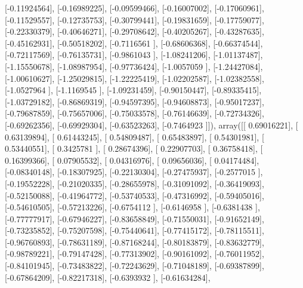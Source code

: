 \documentclass{article}
\begin{document}
       [-0.11924564],
       [-0.16989225],
       [-0.09599466],
       [-0.16007002],
       [-0.17060961],
       [-0.11529557],
       [-0.12735753],
       [-0.30799441],
       [-0.19831659],
       [-0.17759077],
       [-0.22330379],
       [-0.40646271],
       [-0.29708642],
       [-0.40205267],
       [-0.43287635],
       [-0.45162931],
       [-0.50518202],
       [-0.7116561 ],
       [-0.68606368],
       [-0.66374544],
       [-0.72117569],
       [-0.76135731],
       [-0.9861043 ],
       [-1.08241206],
       [-1.01137487],
       [-1.15550678],
       [-1.08987954],
       [-0.97736424],
       [-1.0057059 ],
       [-1.24427084],
       [-1.00610627],
       [-1.25029815],
       [-1.22225419],
       [-1.02202587],
       [-1.02382558],
       [-1.0527964 ],
       [-1.1169545 ],
       [-1.09231459],
       [-0.90150447],
       [-0.89335415],
       [-1.03729182],
       [-0.86869319],
       [-0.94597395],
       [-0.94608873],
       [-0.95017237],
       [-0.79687859],
       [-0.75657006],
       [-0.75033578],
       [-0.76146639],
       [-0.72734326],
       [-0.69262356],
       [-0.69929304],
       [-0.63523263],
       [-0.7464923 ]]), array([[ 0.69016221],
       [ 0.63139894],
       [ 0.61443245],
       [ 0.54809487],
       [ 0.65483897],
       [ 0.54301981],
       [ 0.53440551],
       [ 0.3425781 ],
       [ 0.28674396],
       [ 0.22907703],
       [ 0.36758418],
       [ 0.16399366],
       [ 0.07905532],
       [ 0.04316976],
       [ 0.09656036],
       [ 0.04174484],
       [-0.08340148],
       [-0.18307925],
       [-0.22130304],
       [-0.27475937],
       [-0.2577015 ],
       [-0.19552228],
       [-0.21020335],
       [-0.28655978],
       [-0.31091092],
       [-0.36419093],
       [-0.52150088],
       [-0.41964772],
       [-0.53740533],
       [-0.47316992],
       [-0.59405016],
       [-0.54610505],
       [-0.57213226],
       [-0.6754112 ],
       [-0.6146958 ],
       [-0.6381438 ],
       [-0.77777917],
       [-0.67946227],
       [-0.83658849],
       [-0.71550031],
       [-0.91652149],
       [-0.73235852],
       [-0.75207598],
       [-0.75440641],
       [-0.77415172],
       [-0.78115511],
       [-0.96760893],
       [-0.78631189],
       [-0.87168244],
       [-0.80183879],
       [-0.83632779],
       [-0.98789221],
       [-0.79147428],
       [-0.77313902],
       [-0.90161092],
       [-0.76011952],
       [-0.84101945],
       [-0.73483822],
       [-0.72243629],
       [-0.71048189],
       [-0.69387899],
       [-0.67864209],
       [-0.82217318],
       [-0.6393932 ],
       [-0.61634284],
\end{document}
